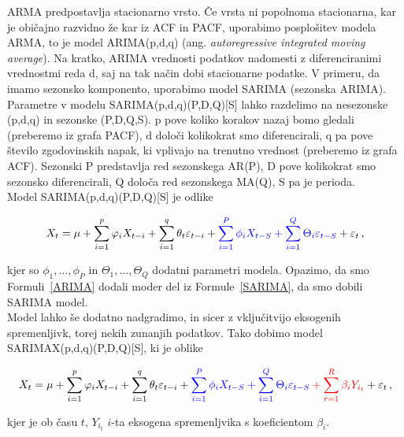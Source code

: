 \documentclass[a4paper, 11pt]{article}
\begin{document}
\noindent ARMA predpostavlja stacionarno vrsto. Če vrsta ni popolnoma stacionarna, kar je običajno razvidno 
že kar iz ACF in PACF, uporabimo posplošitev modela ARMA, to je model ARIMA(p,d,q) (ang. \emph{autoregressive integrated moving average}).
Na kratko, ARIMA vrednosti podatkov nadomesti z diferenciranimi vrednostmi reda d, saj na tak način dobi stacionarne podatke.
V primeru, da imamo sezonsko komponento, uporabimo model SARIMA (sezonska ARIMA). Parametre v modelu
SARIMA(p,d,q)(P,D,Q)[S] lahko razdelimo na nesezonske (p,d,q) in sezonske (P,D,Q,S). 
p pove koliko korakov nazaj bomo gledali (preberemo iz grafa PACF), 
d določi kolikokrat smo diferencirali,
q pa pove število zgodovinskih napak, ki vplivajo na trenutno vrednost (preberemo iz grafa ACF).
Sezonski P predstavlja red sezonskega AR(P), 
D pove kolikokrat smo sezonsko diferencirali,
Q določa red sezonskega MA(Q), 
S pa je perioda. \cite{SARIMA_param} \\

\noindent Model SARIMA(p,d,q)(P,D,Q)[S] je odlike

\begin{equation}
    \label{SARIMA}
    X_t = \mu + \sum_{i=1}^{p}{\varphi_i X_{t-i}} + \sum_{i=1}^{q}{\theta_t \varepsilon_{t-i}} + \color{blue} \sum_{i=1}^{P}{\phi_i X_{t-S}} + \sum_{i=1}^{Q}{\Theta_i \varepsilon_{t-S}}  \color{black} +  \varepsilon_t\,,
\end{equation}

\noindent kjer so $\phi_1, \dots, \phi_P$ in $\Theta_1, \dots, \Theta_Q$ dodatni parametri modela. Opazimo, da 
smo Formuli~\eqref{ARIMA} dodali moder del iz Formule~\eqref{SARIMA}, da smo dobili SARIMA model. \\

\noindent Model lahko še dodatno nadgradimo, in sicer z vključitvijo eksogenih spremenljivk, torej nekih zunanjih podatkov. Tako
dobimo model SARIMAX(p,d,q)(P,D,Q)[S], ki je oblike

\begin{equation}
    \label{SARIMAX}
    X_t = \mu + \sum_{i=1}^{p}{\varphi_i X_{t-i}} + \sum_{i=1}^{q}{\theta_t \varepsilon_{t-i}} + \color{blue} \sum_{i=1}^{P}{\phi_i X_{t-S}} + \sum_{i=1}^{Q}{\Theta_i \varepsilon_{t-S}}  \color{red}  + \sum_{r=1}^{R}{\beta_i Y_{i_{t}}} \color{black} +  \varepsilon_t\,,
\end{equation}

\noindent kjer je ob času $t$, $Y_{i_t}$ $i$-ta eksogena spremenljvika s koeficientom $\beta_i$. \cite{ARMA_ARIMA_SARIMA_SARIMAX}
\end{document}
